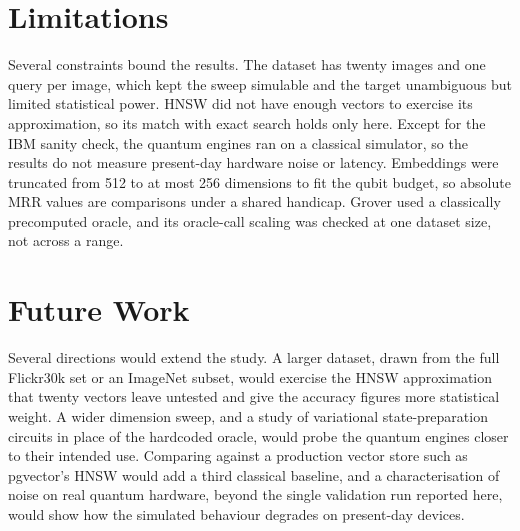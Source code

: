 \section{Limitations}
\label{sec:conclusion:limitations}

Several constraints bound the results. The dataset has twenty images and one
query per image, which kept the sweep simulable and the target unambiguous but
limited statistical power. HNSW did not have enough vectors to exercise its
approximation, so its match with exact search holds only here. Except for the
IBM sanity check, the quantum engines ran on a classical simulator, so the
results do not measure present-day hardware noise or latency. Embeddings were
truncated from 512 to at most 256 dimensions to fit the qubit budget, so absolute
MRR values are comparisons under a shared handicap. Grover used a classically
precomputed oracle, and its oracle-call scaling was checked at one dataset size,
not across a range.

\section{Future Work}
\label{sec:conclusion:futurework}

Several directions would extend the study. A larger dataset, drawn from the full
Flickr30k set or an ImageNet subset, would exercise the HNSW approximation that
twenty vectors leave untested and give the accuracy figures more statistical
weight. A wider dimension sweep, and a study of variational state-preparation
circuits in place of the hardcoded oracle, would probe the quantum engines closer
to their intended use. Comparing against a production vector store such as
pgvector's HNSW would add a third classical baseline, and a characterisation of
noise on real quantum hardware, beyond the single validation run reported here,
would show how the simulated behaviour degrades on present-day devices.
